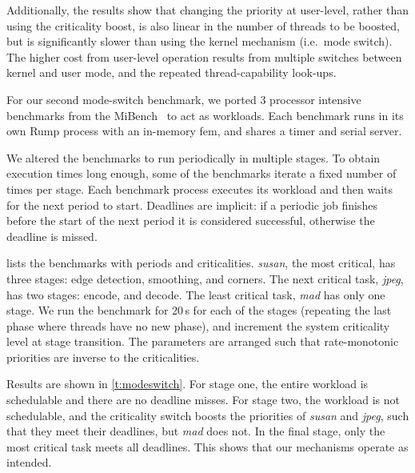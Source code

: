 Additionally, the results show that changing the priority at user-level, rather than using the
criticality boost, is also linear in the number of threads to be boosted, but  is significantly slower than using the kernel mechanism (i.e.\ mode switch).
The higher cost from user-level operation results from  multiple switches between kernel and user mode, and the repeated thread-capability look-ups.

For our second mode-switch benchmark, we ported 3 processor intensive benchmarks from the
MiBench~\citep{Guthaus_REAMB_01} to act as workloads. Each benchmark runs in its own Rump process
with an in-memory fem, and shares a timer and serial server.

We altered the benchmarks to run periodically in multiple stages. To obtain
execution times long enough, some of the benchmarks iterate a fixed number of times per
stage. Each benchmark process executes its workload and then waits for the next period to start.
Deadlines are implicit: if a periodic job finishes before the start of the next period it is
considered successful, otherwise the deadline is missed.

 lists the benchmarks with periods and criticalities.
\textit{susan}, the most critical, has three stages: edge detection, smoothing, and corners. The
next critical task, \textit{jpeg}, has two stages: encode, and decode. The least
critical task, \textit{mad} has only one stage. We run the benchmark
for 20\,s for each of the stages (repeating the last phase where
threads have no new phase), and
increment the system criticality level at stage transition. The parameters are arranged such that
rate-monotonic priorities are inverse to the criticalities.

Results are shown in \autoref{t:modeswitch}. For stage one, the entire workload is schedulable and
there are no deadline misses. For stage two, the workload is not
schedulable, and the criticality switch boosts the priorities of
\textit{susan} and \textit{jpeg}, such that they meet
their deadlines, but
\textit{mad} does not. In the final stage, only the most critical task
meets all deadlines.
This shows that our mechanisms operate as intended.


